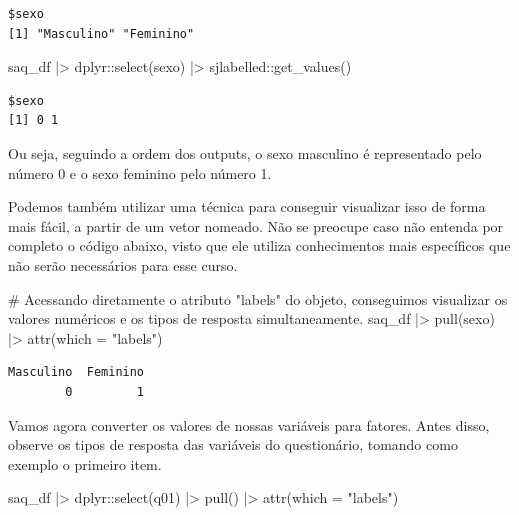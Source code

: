 \documentclass[
  letterpaper,
  DIV=11,
  numbers=noendperiod]{scrartcl}
\newenvironment{Shaded}{\begin{snugshade}}{\end{snugshade}}
\newcommand{\AttributeTok}[1]{\textcolor[rgb]{0.40,0.45,0.13}{#1}}
\newcommand{\CommentTok}[1]{\textcolor[rgb]{0.37,0.37,0.37}{#1}}
\newcommand{\FunctionTok}[1]{\textcolor[rgb]{0.28,0.35,0.67}{#1}}
\newcommand{\NormalTok}[1]{\textcolor[rgb]{0.00,0.23,0.31}{#1}}
\newcommand{\SpecialCharTok}[1]{\textcolor[rgb]{0.37,0.37,0.37}{#1}}
\newcommand{\StringTok}[1]{\textcolor[rgb]{0.13,0.47,0.30}{#1}}
\begin{document}
\begin{verbatim}
$sexo
[1] "Masculino" "Feminino" 
\end{verbatim}

\begin{Shaded}
\begin{Highlighting}[]
\NormalTok{saq\_df }\SpecialCharTok{|\textgreater{}} 
\NormalTok{  dplyr}\SpecialCharTok{::}\FunctionTok{select}\NormalTok{(sexo) }\SpecialCharTok{|\textgreater{}} 
\NormalTok{  sjlabelled}\SpecialCharTok{::}\FunctionTok{get\_values}\NormalTok{() }
\end{Highlighting}
\end{Shaded}

\begin{verbatim}
$sexo
[1] 0 1
\end{verbatim}

Ou seja, seguindo a ordem dos outputs, o sexo masculino é representado
pelo número 0 e o sexo feminino pelo número 1.

Podemos também utilizar uma técnica para conseguir visualizar isso de
forma mais fácil, a partir de um vetor nomeado. Não se preocupe caso não
entenda por completo o código abaixo, visto que ele utiliza
conhecimentos mais específicos que não serão necessários para esse
curso.

\begin{Shaded}
\begin{Highlighting}[]
\CommentTok{\# Acessando diretamente o atributo "labels" do objeto, conseguimos visualizar os valores numéricos e os tipos de resposta simultaneamente.}
\NormalTok{saq\_df }\SpecialCharTok{|\textgreater{}} 
  \FunctionTok{pull}\NormalTok{(sexo) }\SpecialCharTok{|\textgreater{}} 
  \FunctionTok{attr}\NormalTok{(}\AttributeTok{which =} \StringTok{"labels"}\NormalTok{)}
\end{Highlighting}
\end{Shaded}

\begin{verbatim}
Masculino  Feminino 
        0         1 
\end{verbatim}

Vamos agora converter os valores de nossas variáveis para fatores. Antes
disso, observe os tipos de resposta das variáveis do questionário,
tomando como exemplo o primeiro item.

\begin{Shaded}
\begin{Highlighting}[]
\NormalTok{saq\_df }\SpecialCharTok{|\textgreater{}} 
\NormalTok{  dplyr}\SpecialCharTok{::}\FunctionTok{select}\NormalTok{(q01) }\SpecialCharTok{|\textgreater{}}
  \FunctionTok{pull}\NormalTok{() }\SpecialCharTok{|\textgreater{}} 
  \FunctionTok{attr}\NormalTok{(}\AttributeTok{which =} \StringTok{"labels"}\NormalTok{)}
\end{Highlighting}
\end{Shaded}
\end{document}
